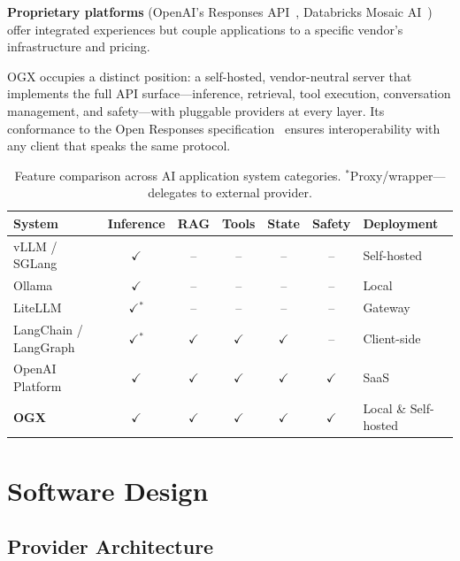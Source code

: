 \documentclass[11pt]{article}
\begin{document}
\textbf{Proprietary platforms} (OpenAI's Responses API~\cite{openaiResponsesAPI}, Databricks Mosaic AI~\cite{databricksAgentFramework}) offer integrated experiences but couple applications to a specific vendor's infrastructure and pricing.

OGX occupies a distinct position: a self-hosted, vendor-neutral server that implements the full API surface---inference, retrieval, tool execution, conversation management, and safety---with pluggable providers at every layer. Its conformance to the Open Responses specification~\cite{openresponses} ensures interoperability with any client that speaks the same protocol.

\begin{table}[htbp]
  \centering
  \small
  \setlength{\tabcolsep}{4pt}
  \renewcommand{\arraystretch}{1.15}
  \begin{tabularx}{\textwidth}{@{}l|ccccc>{\raggedright\arraybackslash}X@{}}
  \toprule
  System & Inference & RAG & Tools & State & Safety & Deployment \\
  \midrule
  vLLM / SGLang & $\checkmark$ & -- & -- & -- & -- & Self-hosted \\
  Ollama & $\checkmark$ & -- & -- & -- & -- & Local \\
  LiteLLM & $\checkmark$$^*$ & -- & -- & -- & -- & Gateway \\
  LangChain / LangGraph & $\checkmark$$^*$ & $\checkmark$ & $\checkmark$ & $\checkmark$ & -- & Client-side \\
  OpenAI Platform & $\checkmark$ & $\checkmark$ & $\checkmark$ & $\checkmark$ & $\checkmark$ & SaaS \\
  \textbf{OGX} & $\checkmark$ & $\checkmark$ & $\checkmark$ & $\checkmark$ & $\checkmark$ & Local \& Self-hosted \\
  \bottomrule
  \end{tabularx}
  \caption{Feature comparison across AI application system categories. $^*$Proxy/wrapper---delegates to external provider.}
  \label{tab:comparison}
\end{table}

\section{Software Design}
\label{sec:design}

\subsection{Provider Architecture}
\end{document}
